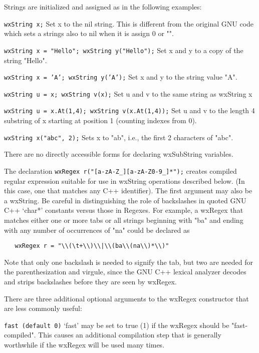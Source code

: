 Strings are initialized and assigned as in the following examples:

{\tt wxString x;} 
Set x to the nil string. This is different from the original GNU code
which sets a strings also to nil when it is assign 0 or "".

{\tt wxString x = "Hello"; wxString y("Hello");} 
Set x and y to a copy of the string "Hello".

{\tt wxString x = 'A'; wxString y('A');} 
Set x and y to the string value "A".

{\tt wxString u = x; wxString v(x);} 
Set u and v to the same string as wxString x

{\tt wxString u = x.At(1,4); wxString v(x.At(1,4));} 
Set u and v to the length 4 substring of x starting at position 1
(counting indexes from 0).

{\tt wxString x("abc", 2);} 
Sets x to "ab", i.e., the first 2 characters of "abc".

There are no directly accessible forms for declaring wxSubString
variables.

The declaration \verb$wxRegex r("[a-zA-Z_][a-zA-Z0-9_]*");$ creates
compiled regular expression suitable for use in wxString operations
described below. (In this case, one that matches any C++ identifier).
The first argument may also be a wxString.  Be careful in distinguishing
the role of backslashes in quoted GNU C++ `char*' constants versus those
in Regexes. For example, a wxRegex that matches either one or more tabs
or all strings beginning with "ba" and ending with any number of
occurrences of "na" could be declared as 

\begin{verbatim} 
   wxRegex r = "\\(\t+\\)\\|\\(ba\\(na\\)*\\)"
\end{verbatim}

Note that only one backslash is needed
to signify the tab, but two are needed for the parenthesization and
virgule, since the GNU C++ lexical analyzer decodes and strips
backslashes before they are seen by wxRegex.

There are three additional optional arguments to the wxRegex
constructor that are less commonly useful:

{\tt fast (default 0)} 
`fast' may be set to true (1) if the wxRegex should be
"fast-compiled". This causes an additional compilation step that
is generally worthwhile if the wxRegex will be used many times.

